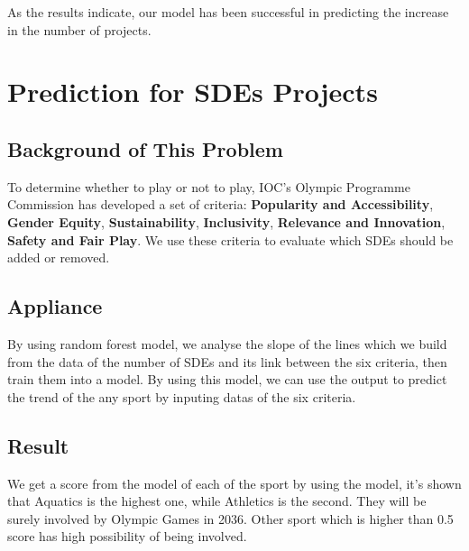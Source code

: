 \documentclass[a4paper]{article}
\begin{document}

As the results indicate, our model has been successful in predicting the increase in the number of projects.



\section{Prediction for SDEs Projects}
\subsection{Background of This Problem}
To determine whether to play or not to play, IOC’s Olympic Programme Commission has developed a set of 
criteria: \textbf{Popularity and Accessibility}, \textbf{Gender Equity},  \textbf{Sustainability}, \textbf{Inclusivity}, \textbf{Relevance and Innovation}, \textbf{Safety and Fair Play}. We use these criteria to evaluate which SDEs should be added or removed.
\subsection{Appliance}
By using random forest model, we analyse the slope of the lines which we build from the data of the number of SDEs and its link between the six criteria, then train them into a model. By using this model, we can use the output to predict the trend of the any sport by inputing datas of the six criteria.
\subsection{Result}
We get a score from the model of each of the sport by using the model, it's shown that Aquatics is the highest one, while Athletics is the second. They will be surely involved by Olympic Games in 2036. Other sport which is higher than 0.5 score has high possibility of being involved.
\end{document}
